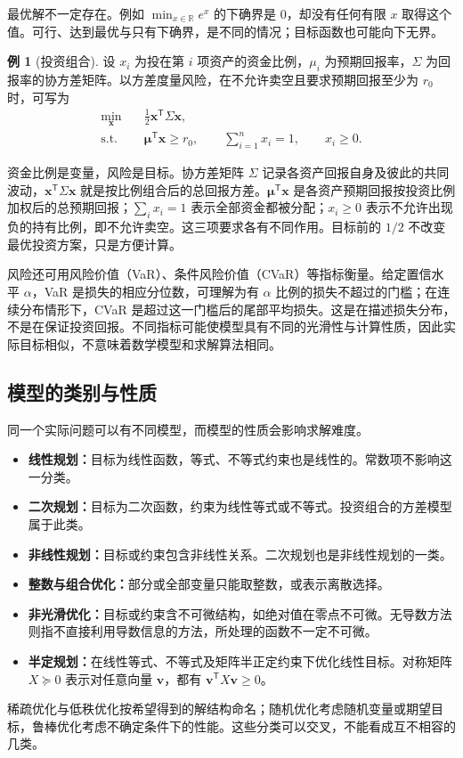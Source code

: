 \documentclass[UTF8,fontset=fandol,a4paper,12pt]{ctexart}
\newcommand{\R}{\mathbb R}
\newcommand{\vx}{\boldsymbol x}
\theoremstyle{definition}
\newtheorem{example}[definition]{例}
\begin{document}
最优解不一定存在。例如 $\min_{x\in\R}e^x$ 的下确界是 $0$，却没有任何有限 $x$ 取得这个值。可行、达到最优与只有下确界，是不同的情况；目标函数也可能向下无界。

\begin{example}[投资组合]
设 $x_i$ 为投在第 $i$ 项资产的资金比例，$\mu_i$ 为预期回报率，$\Sigma$ 为回报率的协方差矩阵。以方差度量风险，在不允许卖空且要求预期回报至少为 $r_0$ 时，可写为
\[
 \begin{aligned}
 \min_{\vx}\quad&\frac12\vx^{\mathsf T}\Sigma\vx,\\
 \text{s.t.}\quad&\boldsymbol\mu^{\mathsf T}\vx\ge r_0,\qquad
 \sum_{i=1}^n x_i=1,\qquad x_i\ge0.
 \end{aligned}
\]
\end{example}
资金比例是变量，风险是目标。协方差矩阵 $\Sigma$ 记录各资产回报自身及彼此的共同波动，$\vx^{\mathsf T}\Sigma\vx$ 就是按比例组合后的总回报方差。$\boldsymbol\mu^{\mathsf T}\vx$ 是各资产预期回报按投资比例加权后的总预期回报；$\sum_i x_i=1$ 表示全部资金都被分配；$x_i\ge0$ 表示不允许出现负的持有比例，即不允许卖空。这三项要求各有不同作用。目标前的 $1/2$ 不改变最优投资方案，只是方便计算。

风险还可用风险价值（VaR）、条件风险价值（CVaR）等指标衡量。给定置信水平 $\alpha$，VaR 是损失的相应分位数，可理解为有 $\alpha$ 比例的损失不超过的门槛；在连续分布情形下，CVaR 是超过这一门槛后的尾部平均损失。这是在描述损失分布，不是在保证投资回报。不同指标可能使模型具有不同的光滑性与计算性质，因此实际目标相似，不意味着数学模型和求解算法相同。

\subsection{模型的类别与性质}
同一个实际问题可以有不同模型，而模型的性质会影响求解难度。
\begin{itemize}
\item \textbf{线性规划：}目标为线性函数，等式、不等式约束也是线性的。常数项不影响这一分类。
\item \textbf{二次规划：}目标为二次函数，约束为线性等式或不等式。投资组合的方差模型属于此类。
\item \textbf{非线性规划：}目标或约束包含非线性关系。二次规划也是非线性规划的一类。
\item \textbf{整数与组合优化：}部分或全部变量只能取整数，或表示离散选择。
\item \textbf{非光滑优化：}目标或约束含不可微结构，如绝对值在零点不可微。无导数方法则指不直接利用导数信息的方法，所处理的函数不一定不可微。
\item \textbf{半定规划：}在线性等式、不等式及矩阵半正定约束下优化线性目标。对称矩阵 $X\succeq0$ 表示对任意向量 $\boldsymbol v$，都有 $\boldsymbol v^{\mathsf T}X\boldsymbol v\ge0$。
\end{itemize}
稀疏优化与低秩优化按希望得到的解结构命名；随机优化考虑随机变量或期望目标，鲁棒优化考虑不确定条件下的性能。这些分类可以交叉，不能看成互不相容的几类。
\end{document}
